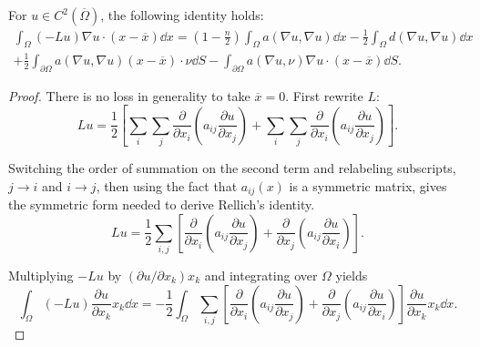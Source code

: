 \begin{lemma}[Rellich]
  For $u \in C^2(\overline{\Omega})$, the following identity holds:
  \begin{multline}
    \label{eq:rellich}
    \int_{\Omega}(-Lu)\nabla u\cdot (x-\overline{x})\dd{x}
    = (1-\frac{n}{2}) \int_{\Omega} a(\nabla u,\nabla u) \dd{x}
    -
    \frac{1}{2} \int_{\Omega}
    d(\nabla u, \nabla u) \dd{x}
    \\
    + \frac{1}{2} \int_{\partial\Omega} a(\nabla u,\nabla u)(x-\overline{x})
    \cdot \nu \dd{S} - \int_{\partial\Omega} a(\nabla u,\nu )\nabla u\cdot
    (x-\overline{x}) \dd{S}.
  \end{multline}


\end{lemma}
\begin{proof}
  There is no loss in generality to take $\overline{x} = 0$. First rewrite $L$:
  \[
    Lu = \frac{1}{2}\left[ \sum_{i}\sum_{j} \frac{\partial}{\partial x_i}
    \left( a_{ij} \frac{\partial u}{\partial x_j} \right) + \sum_{i}\sum_{j}
    \frac{\partial}{\partial x_i} \left( a_{ij} \frac{\partial u}{\partial x_j}
    \right) \right].
  \]


  Switching the order of summation on the second term and relabeling
  subscripts, $j \rightarrow i$ and $i \rightarrow j$, then using the fact
  that $a_{ij}(x)$ is a symmetric matrix, gives the symmetric form needed to
  derive Rellich's identity.
  \[
    Lu = \frac{1}{2} \sum_{i,j}\left[
    \frac{\partial}{\partial x_i}
    \left( a_{ij} \frac{\partial u}{\partial x_j} \right) +
    \frac{\partial}{\partial x_j}
    \left( a_{ij} \frac{\partial u}{\partial x_i} \right)
    \right].
  \]


  Multiplying $-Lu$ by $(\partial u / \partial x_k) x_k$ and integrating
  over $\Omega$ yields
  \[
    \int_{\Omega}(-Lu)\frac{\partial u}{\partial x_k} x_k \dd{x}= -\frac{1}{2}
    \int_{\Omega} \sum_{i,j}\left[ \frac{\partial}{\partial x_i} \left( a_{ij}
    \frac{\partial u}{\partial x_j} \right) + \frac{\partial}{\partial x_j}
    \left( a_{ij} \frac{\partial u}{\partial x_i} \right) \right]
    \frac{\partial u}{\partial x_k} x_k \dd{x}.
  \]



\end{proof}

